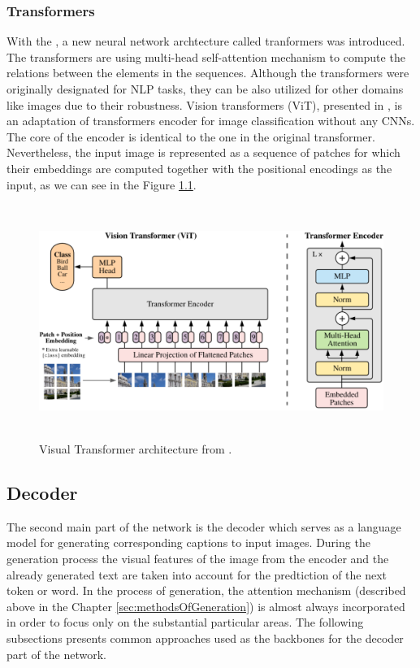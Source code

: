 \subsubsection{Transformers}
\label{sec:transformersEncoder}
With the \citet{vaswani2017attention}, a new neural network archtecture called tranformers was introduced. The transformers are using multi-head self-attention mechanism to compute the relations between the elements in the sequences. Although the transformers were originally designated for NLP tasks, they can be also utilized for other domains like images due to their robustness. Vision transformers (ViT), presented in \citet{dosovitskiy2020image}, is an adaptation of transformers encoder for image classification without any CNNs. The core of the encoder is identical to the one in the original transformer. Nevertheless, the input image is represented as a sequence of patches for which their embeddings are computed together with the positional encodings as the input, as we can see in the Figure \hyperref[fig01:ViT]{1.1}.

\begin{figure}[h]\centering
\includegraphics[width=145mm, height=76mm]{../img/VisualTransformerArchitecture}
\caption{Visual Transformer architecture from \citet{dosovitskiy2020image}.}
\label{fig01:ViT}
\end{figure}

\subsection{Decoder}
The second main part of the network is the decoder which serves as a language model for generating corresponding captions to input images. During the generation process the visual features of the image from the encoder and the already generated text are taken into account for the predtiction of the next token or word. In the process of generation, the attention mechanism (described above in the Chapter \ref{sec:methodsOfGeneration}) is almost always incorporated in order to focus only on the substantial particular areas. The following subsections presents common approaches used as the backbones for the decoder part of the network.
